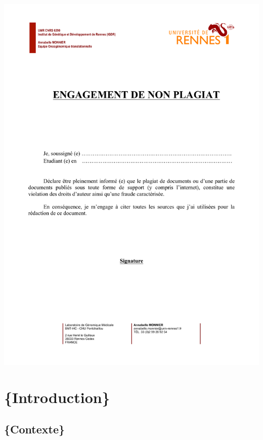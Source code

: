 \documentclass[
  12pt,
]{article}
\begin{document}
\newpage
\begin{center}
\includegraphics[width=10in]{attestationDeNonPlagiat.pdf}
\end{center}


\newpage
\setcounter{tocdepth}{4}
\tableofcontents
\newpage

\hypertarget{introduction}{%
\section{\texorpdfstring{\Large\{Introduction\}}{\{Introduction\}}}\label{introduction}}

\hypertarget{contexte}{%
\subsection{\texorpdfstring{\large\{Contexte\}}{\{Contexte\}}}\label{contexte}}
\end{document}
